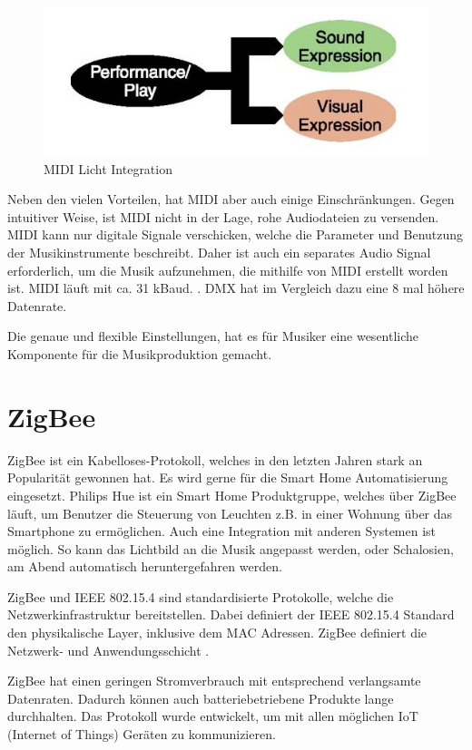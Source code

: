 \begin{figure}[H]
	\centering
	\includegraphics[width=.6\linewidth]{Pictures/MidiVisual}
	\caption{MIDI Licht Integration \cite[p. 1]{MIDI-Visual-Control}}
	\label{fig:Midi_Light_Integration}
\end{figure}


Neben den vielen Vorteilen, hat MIDI aber auch einige Einschränkungen. Gegen intuitiver Weise, ist MIDI nicht in der Lage, rohe Audiodateien zu versenden. MIDI kann nur digitale Signale verschicken, welche die Parameter und Benutzung der Musikinstrumente beschreibt. Daher ist auch ein separates Audio Signal erforderlich, um die Musik aufzunehmen, die mithilfe von MIDI erstellt worden ist. MIDI läuft mit ca. 31 kBaud. \cite[p. 1]{MIDI-DETAILED-SPECIFICATION}. DMX hat im Vergleich dazu eine 8 mal höhere Datenrate. 

Die genaue und flexible Einstellungen, hat es für Musiker eine wesentliche Komponente für die Musikproduktion gemacht.


\section{ZigBee}
ZigBee ist ein Kabelloses-Protokoll, welches in den letzten Jahren stark an Popularität gewonnen hat. Es wird gerne für die Smart Home Automatisierung eingesetzt. Philips Hue ist ein Smart Home Produktgruppe, welches über ZigBee läuft, um Benutzer die Steuerung von Leuchten z.B. in einer Wohnung über das Smartphone zu ermöglichen. Auch eine Integration mit anderen Systemen ist möglich. So kann das Lichtbild an die Musik angepasst werden, oder Schalosien, am Abend automatisch heruntergefahren werden.

ZigBee und IEEE 802.15.4 sind standardisierte Protokolle, welche die Netzwerkinfrastruktur bereitstellen. Dabei definiert der IEEE 802.15.4 Standard den physikalische Layer, inklusive dem MAC Adressen. ZigBee definiert die Netzwerk- und Anwendungsschicht \cite[p.5]{GettingStartedWithZigBee}.

ZigBee hat einen geringen Stromverbrauch mit entsprechend verlangsamte Datenraten. Dadurch können auch batteriebetriebene Produkte lange durchhalten. Das Protokoll wurde entwickelt, um mit allen möglichen IoT (Internet of Things) Geräten zu kommunizieren.

